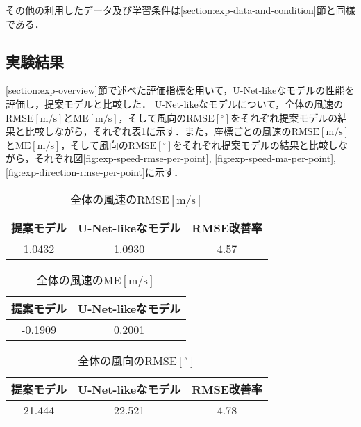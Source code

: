 その他の利用したデータ及び学習条件は\ref{section:exp-data-and-condition}節と同様である．

\subsection{実験結果 \label{subsection:exp-results-without-physicial-structure}}
\ref{section:exp-overview}節で述べた評価指標を用いて，U-Net-likeなモデルの性能を評価し，提案モデルと比較した．
U-Net-likeなモデルについて，全体の風速の$\mathrm{RMSE[m/s]}$と$\mathrm{ME[m/s]}$，そして風向の$\mathrm{RMSE[^\circ]}$をそれぞれ提案モデルの結果と比較しながら，それぞれ表\ref{table:exp-total-rmse}に示す．また，座標ごとの風速の$\mathrm{RMSE[m/s]}$と$\mathrm{ME[m/s]}$，そして風向の$\mathrm{RMSE[^\circ]}$をそれぞれ提案モデルの結果と比較しながら，それぞれ図\ref{fig:exp-speed-rmse-per-point}, \ref{fig:exp-speed-ma-per-point}, \ref{fig:exp-direction-rmse-per-point}に示す．

\begin{table}[bp]
  \caption{全体の風速の$\mathrm{RMSE[m/s]}$}
  \label{table:exp-total-rmse}
  \centering
  \begin{tabular}{ccc}
    \hline
    提案モデル & U-Net-likeなモデル & RMSE改善率 \\
    \hline
    1.0432 & 1.0930 & 4.57 \\
    \hline
  \end{tabular}
\end{table}

\begin{table}[bp]
  \caption{全体の風速の$\mathrm{ME[m/s]}$}
  \label{table:exp-total-me}
  \centering
  \begin{tabular}{cc}
    \hline
    提案モデル & U-Net-likeなモデル \\
    \hline
    -0.1909 & 0.2001 \\
    \hline
  \end{tabular}
\end{table}

\begin{table}[bp]
  \caption{全体の風向の$\mathrm{RMSE[^\circ]}$}
  \label{table:exp-total-direction-rmse}
  \centering
  \begin{tabular}{ccc}
    \hline
    提案モデル & U-Net-likeなモデル & RMSE改善率 \\
    \hline
    21.444 & 22.521 & 4.78 \\
    \hline
  \end{tabular}
\end{table}

